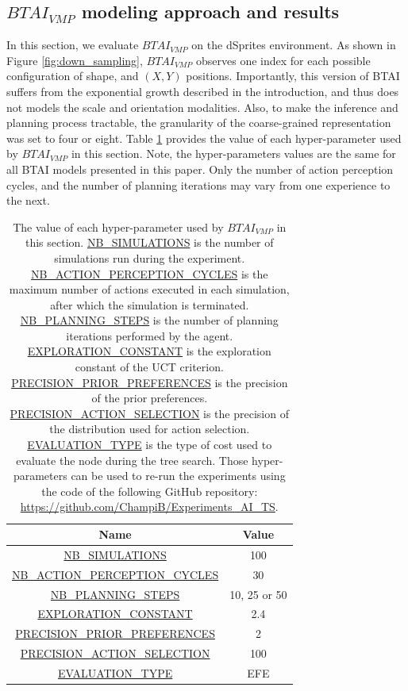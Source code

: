 \documentclass[twoside,11pt]{article}
\begin{document}
\subsection{$BTAI_{VMP}$ modeling approach and results} \label{ssec:btai_vmp}

In this section, we evaluate $BTAI_{VMP}$ \citep{AITS_THEORY,AITS_PRACTICE} on the dSprites environment. As shown in Figure \ref{fig:down_sampling}, $BTAI_{VMP}$ observes one index for each possible configuration of shape, and $(X, Y)$ positions. Importantly, this version of BTAI suffers from the exponential growth described in the introduction, and thus does not models the scale and orientation modalities. Also, to make the inference and planning process tractable, the granularity of the coarse-grained representation was set to four or eight. Table \ref{tab:values_hp_BTAI_dSprites} provides the value of each hyper-parameter used by $BTAI_{VMP}$ in this section. Note, the hyper-parameters values are the same for all BTAI models presented in this paper. Only the number of action perception cycles, and the number of planning iterations may vary from one experience to the next.

\begin{table}[H]
\centering
\begin{tabular}{ |c|c|  }
 \hline
 Name & Value\\
 \hline
 \hline
 \url{NB_SIMULATIONS} & 100\\
 \hline
 \url{NB_ACTION_PERCEPTION_CYCLES} & 30\\
 \hline
 \url{NB_PLANNING_STEPS} & 10, 25 or 50\\
 \hline
 \url{EXPLORATION_CONSTANT} & 2.4\\
 \hline
 \url{PRECISION_PRIOR_PREFERENCES} & 2\\
 \hline
 \url{PRECISION_ACTION_SELECTION} & 100\\
 \hline
 \url{EVALUATION_TYPE} & EFE\\
 \hline
\end{tabular}
\caption{The value of each hyper-parameter used by $BTAI_{VMP}$ in this section. \url{NB_SIMULATIONS} is the number of simulations run during the experiment. \url{NB_ACTION_PERCEPTION_CYCLES} is the maximum number of actions executed in each simulation, after which the simulation is terminated. \url{NB_PLANNING_STEPS} is the number of planning iterations performed by the agent. \url{EXPLORATION_CONSTANT} is the exploration constant of the UCT criterion. \url{PRECISION_PRIOR_PREFERENCES} is the precision of the prior preferences. \url{PRECISION_ACTION_SELECTION} is the precision of the distribution used for action selection. \url{EVALUATION_TYPE} is the type of cost used to evaluate the node during the tree search. Those hyper-parameters can be used to re-run the experiments using the code of the following GitHub repository: \url{https://github.com/ChampiB/Experiments_AI_TS}.}
\label{tab:values_hp_BTAI_dSprites}
\end{table}
\end{document}

